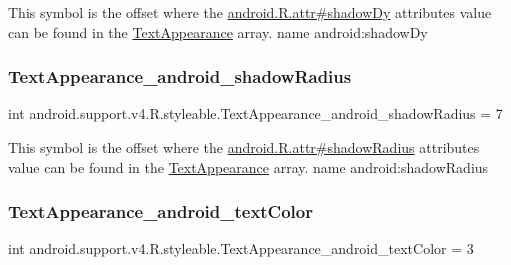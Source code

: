 This symbol is the offset where the \hyperlink{}{android.\+R.\+attr\#shadow\+Dy} attribute\textquotesingle{}s value can be found in the \hyperlink{classandroid_1_1support_1_1v4_1_1R_1_1styleable_a81c402d7a6e327c354a1cf72b21fc4f5}{Text\+Appearance} array.  name android\+:shadow\+Dy \mbox{\label{classandroid_1_1support_1_1v4_1_1R_1_1styleable_a6d669faeb8b3585d3807aa0124a6bf14}} 
\subsubsection{\texorpdfstring{Text\+Appearance\+\_\+android\+\_\+shadow\+Radius}{TextAppearance\_android\_shadowRadius}}
{\footnotesize\ttfamily int android.\+support.\+v4.\+R.\+styleable.\+Text\+Appearance\+\_\+android\+\_\+shadow\+Radius = 7\hspace{0.3cm}{\ttfamily [static]}}

This symbol is the offset where the \hyperlink{}{android.\+R.\+attr\#shadow\+Radius} attribute\textquotesingle{}s value can be found in the \hyperlink{classandroid_1_1support_1_1v4_1_1R_1_1styleable_a81c402d7a6e327c354a1cf72b21fc4f5}{Text\+Appearance} array.  name android\+:shadow\+Radius \mbox{\label{classandroid_1_1support_1_1v4_1_1R_1_1styleable_ad91d5229f5579d10576dd454b5a76955}} 
\subsubsection{\texorpdfstring{Text\+Appearance\+\_\+android\+\_\+text\+Color}{TextAppearance\_android\_textColor}}
{\footnotesize\ttfamily int android.\+support.\+v4.\+R.\+styleable.\+Text\+Appearance\+\_\+android\+\_\+text\+Color = 3\hspace{0.3cm}{\ttfamily [static]}}

